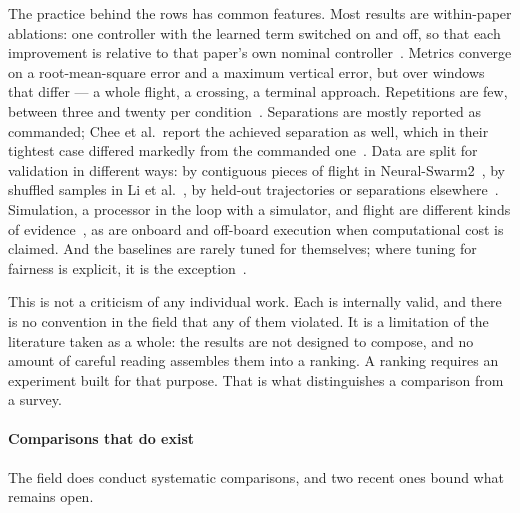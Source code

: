 The practice behind the rows has common features. Most results are within-paper ablations: one
controller with the learned term switched on and off, so that each improvement is relative to that
paper's own nominal
controller~\cite{shi2020neuralswarm,shi2022neuralswarm2,chee2024knodedwmpc,li2023ndpnmpc,hsieh2026flatness}.
Metrics converge on a root-mean-square error and a maximum vertical error, but over windows that
differ --- a whole flight, a crossing, a terminal approach. Repetitions are few, between three and
twenty per condition~\cite{li2023ndpnmpc,shi2020neuralswarm,hsieh2026flatness,shankar2023docking,cobobriesewitz2026lindi}.
Separations are mostly reported as commanded; Chee et al.\ report the achieved separation as well,
which in their tightest case differed markedly from the commanded one~\cite{chee2024knodedwmpc}.
Data are split for validation in different ways: by contiguous pieces of flight in
Neural-Swarm2~\cite{shi2022neuralswarm2}, by shuffled samples in Li et al.~\cite{li2023ndpnmpc}, by
held-out trajectories or separations
elsewhere~\cite{cobobriesewitz2026lindi,hsieh2026flatness}. Simulation, a processor in the loop with
a simulator, and flight are different kinds of evidence~\cite{gu2025comparative,yang2025flatnessresiduals},
as are onboard and off-board execution when computational cost is claimed. And the baselines are
rarely tuned for themselves; where tuning for fairness is explicit, it is the exception~\cite{gu2025comparative}.

This is not a criticism of any individual work. Each is internally valid, and there is no
convention in the field that any of them violated. It is a limitation of the literature taken as a
whole: the results are not designed to compose, and no amount of careful reading assembles them
into a ranking. A ranking requires an experiment built for that purpose. That is what distinguishes
a comparison from a survey.

\label{sec:rw-existing-comparisons}
\paragraph{Comparisons that do exist}

The field does conduct systematic comparisons, and two recent ones bound what remains open.

